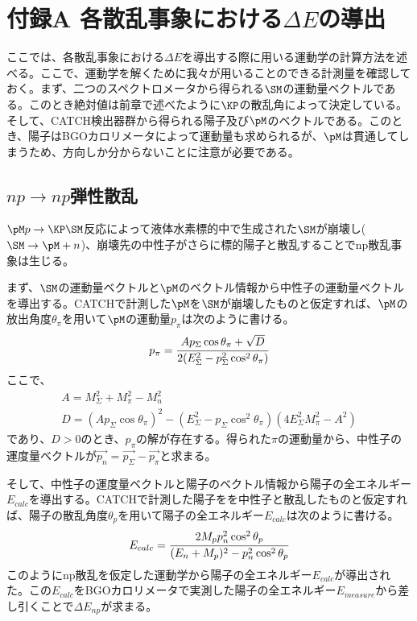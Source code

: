 %
\def\thesection{A.\arabic{section}}
\chapter{{\bf 付録A 各散乱事象における$\Delta E$の導出}}
ここでは、各散乱事象における$\Delta E$を導出する際に用いる運動学の計算方法を述べる。ここで、運動学を解くために我々が用いることのできる計測量を確認しておく。まず、二つのスペクトロメータから得られる$\SM$の運動量ベクトルである。このとき絶対値は前章で述べたように$\KP$の散乱角によって決定している。そして、CATCH検出器群から得られる陽子及び$\pM$のベクトルである。このとき、陽子はBGOカロリメータによって運動量も求められるが、$\pM$は貫通してしまうため、方向しか分からないことに注意が必要である。
\section{$np\rightarrow np$弾性散乱}
$\pM p\rightarrow \KP\SM$反応によって液体水素標的中で生成された$\SM$が崩壊し($\SM\rightarrow\pM +n$)、崩壊先の中性子がさらに標的陽子と散乱することでnp散乱事象は生じる。\par
まず、$\SM$の運動量ベクトルと$\pM$のベクトル情報から中性子の運動量ベクトルを導出する。CATCHで計測した$\pM$を$\SM$が崩壊したものと仮定すれば、$\pM$の放出角度$\theta_{\pi}$を用いて$\pM$の運動量$p_{\pi}$は次のように書ける。
\begin{equation}
p_{\pi} = \cfrac{Ap_{\Sigma}\cos\theta_{\pi}+\sqrt{D}}{2(E^{2}_{\Sigma}-p^2_{\Sigma}\cos^{2}\theta_{\pi})}
\label{eq:decayPiMom}
\end{equation}
ここで、
\begin{gather}
\label{eq:decayPiMom1}
A = M^2_{\Sigma}+M^2_{\pi}-M^2_{n}\\
\label{eq:decayPiMom2}
D = (Ap_{\Sigma}\cos\theta_{\pi})^2-(E^{2}_{\Sigma}-p_{\Sigma}\cos^2\theta_{\pi})(4E^2_{\Sigma}M^2_{\pi}-A^2)
\end{gather}
であり、$D>0$のとき、$p_{\pi}$の解が存在する。得られた$\pi$の運動量から、中性子の運度量ベクトルが$\overrightarrow{p_{n}}=\overrightarrow{p_{\Sigma}}-\overrightarrow{p_{\pi}}$と求まる。\par
そして、中性子の運度量ベクトルと陽子のベクトル情報から陽子の全エネルギー$E_{calc}$を導出する。CATCHで計測した陽子をを中性子と散乱したものと仮定すれば、陽子の散乱角度$\theta_{p}$を用いて陽子の全エネルギー$E_{calc}$は次のように書ける。
\begin{equation}
E_{calc} = \cfrac{2M_{p}p^2_{n}\cos^2\theta_{p}}{(E_{n}+M_{p})^{2}-p^2_{n}\cos^2\theta_{p}}
\end{equation}
このようにnp散乱を仮定した運動学から陽子の全エネルギー$E_{calc}$が導出された。この$E_{calc}$をBGOカロリメータで実測した陽子の全エネルギー$E_{measure}$から差し引くことで$\Delta E_{np}$が求まる。
